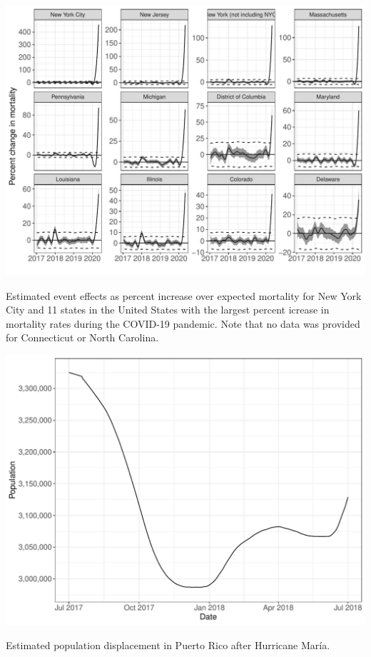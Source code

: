 \documentclass[11pt]{article}
\begin{document}
\begin{suppfigure}[ht]
	\centering
	\includegraphics[width=1\linewidth]{figs/supp-figure-5.pdf} 
	\caption{Estimated event effects as percent increase over expected mortality for New York City and 11 states in the United States with the largest percent icrease in mortality rates during the COVID-19 pandemic. Note that no data was provided for Connecticut or North Carolina.}
	\label{supp-fig:covid19-states}
\end{suppfigure}


\begin{suppfigure}[ht]
	\centering
	\includegraphics[width=1\linewidth]{figs/supp-figure-7.pdf} 
	\caption{Estimated population displacement in Puerto Rico after Hurricane Mar\'ia.}
	\label{supp-fig:pop-displacement-pr}
\end{suppfigure}
\end{document}
